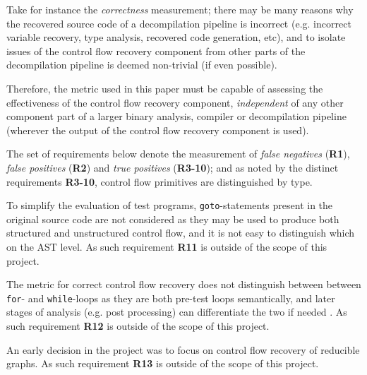 Take for instance the \textit{correctness} measurement; there may be many reasons why the recovered source code of a decompilation pipeline is incorrect (e.g. incorrect variable recovery, type analysis, recovered code generation, etc), and to isolate issues of the control flow recovery component from other parts of the decompilation pipeline is deemed non-trivial (if even possible).

Therefore, the metric used in this paper must be capable of assessing the effectiveness of the control flow recovery component, \textit{independent} of any other component part of a larger binary analysis, compiler or decompilation pipeline (wherever the output of the control flow recovery component is used).

The set of requirements below denote the measurement of \textit{false negatives} (\textbf{R1}), \textit{false positives} (\textbf{R2}) and \textit{true positives} (\textbf{R3-10}); and as noted by the distinct requirements \textbf{R3-10}, control flow primitives are distinguished by type.

To simplify the evaluation of test programs, \texttt{goto}-statements present in the original source code are not considered as they may be used to produce both structured and unstructured control flow, and it is not easy to distinguish which on the AST level. As such requirement \textbf{R11} is outside of the scope of this project.

The metric for correct control flow recovery does not distinguish between between \texttt{for}- and \texttt{while}-loops as they are both pre-test loops semantically, and later stages of analysis (e.g. post processing) can differentiate the two if needed \cite{no_more_gotos}. As such requirement \textbf{R12} is outside of the scope of this project.

An early decision in the project was to focus on control flow recovery of reducible graphs. As such requirement \textbf{R13} is outside of the scope of this project.

